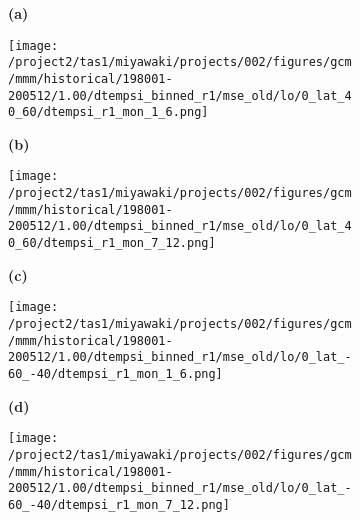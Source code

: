 \documentclass[preview]{standalone}
\begin{document}

% 


\begin{figure}

  \begin{subfigure}[t]{0.05\textwidth}
    \textbf{\normalsize{(a)}}
  \end{subfigure}
  \begin{subfigure}[t]{0.45\textwidth}
    \texttt{[image: /project2/tas1/miyawaki/projects/002/figures/gcm/mmm/historical/198001-200512/1.00/dtempsi\_binned\_r1/mse\_old/lo/0\_lat\_40\_60/dtempsi\_r1\_mon\_1\_6.png]}
  \end{subfigure}
  \begin{subfigure}[t]{0.05\textwidth}
    \textbf{\normalsize{(b)}}
  \end{subfigure}
  \begin{subfigure}[t]{0.45\textwidth}
    \texttt{[image: /project2/tas1/miyawaki/projects/002/figures/gcm/mmm/historical/198001-200512/1.00/dtempsi\_binned\_r1/mse\_old/lo/0\_lat\_40\_60/dtempsi\_r1\_mon\_7\_12.png]}
  \end{subfigure}

  \begin{subfigure}[t]{0.05\textwidth}
    \textbf{\normalsize{(c)}}
  \end{subfigure}
  \begin{subfigure}[t]{0.45\textwidth}
    \texttt{[image: /project2/tas1/miyawaki/projects/002/figures/gcm/mmm/historical/198001-200512/1.00/dtempsi\_binned\_r1/mse\_old/lo/0\_lat\_-60\_-40/dtempsi\_r1\_mon\_1\_6.png]}
  \end{subfigure}
  \begin{subfigure}[t]{0.05\textwidth}
    \textbf{\normalsize{(d)}}
  \end{subfigure}
  \begin{subfigure}[t]{0.45\textwidth}
    \texttt{[image: /project2/tas1/miyawaki/projects/002/figures/gcm/mmm/historical/198001-200512/1.00/dtempsi\_binned\_r1/mse\_old/lo/0\_lat\_-60\_-40/dtempsi\_r1\_mon\_7\_12.png]}
  \end{subfigure}

\end{figure}
\end{document}
